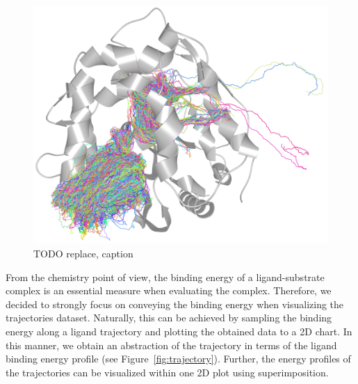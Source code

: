 \documentclass{vgtc}                          %
\begin{document}
\begin{figure}[htb]
  \centering
  \includegraphics[width=\columnwidth]{trajectories}
  \caption{TODO replace, caption}
  \label{fig:trajectories}
\end{figure}

From the chemistry point of view, the binding energy of a ligand-substrate complex is an essential measure when evaluating the complex.
Therefore, we decided to strongly focus on conveying the binding energy when visualizing the trajectories dataset.
Naturally, this can be achieved by sampling the binding energy along a ligand trajectory and plotting the obtained data to a 2D chart.
In this manner, we obtain an abstraction of the trajectory in terms of the ligand binding energy profile (see Figure~\ref{fig:trajectory}).
Further, the energy profiles of the trajectories can be visualized within one 2D plot using superimposition.
\end{document}
